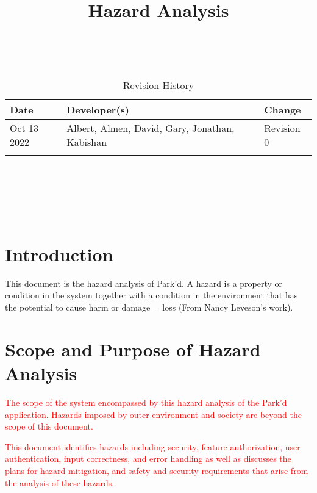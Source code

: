 \documentclass[12pt,letterpaper]{article}
\title{Hazard Analysis\\\progname}
\author{\authname}
\date{}
\begin{document}
\maketitle
\thispagestyle{empty}

~\newpage


\begin{table}[hp]
\caption{Revision History} \label{TblRevisionHistory}
\begin{tabularx}{\textwidth}{lll}
\toprule
\textbf{Date} & \textbf{Developer(s)} & \textbf{Change}\\
\midrule
Oct 13 2022 & Albert, Almen, David, Gary, Jonathan, Kabishan & Revision 0\\
\midrule
\color{red}{Apr 3 2023} & \color{red}{Albert, Almen, David, Gary, Jonathan,
Kabishan} & \color{red}{Revision 1}\\
\bottomrule
\end{tabularx}
\end{table}

~\newpage

\tableofcontents

~\newpage

\listoftables

~\newpage


\section{Introduction}

This document is the hazard analysis of Park'd. A hazard is a property or
condition in the system together with a condition in the environment that has
the potential to cause harm or damage = loss (From Nancy Leveson's work).

\section{Scope and Purpose of Hazard Analysis}

\textcolor{red}{The scope of the system encompassed by this hazard analysis of the Park'd application. Hazards imposed by outer environment and society are beyond the scope of this document.}

\textcolor{red}{This document identifies hazards including security, feature authorization, user authentication, input correctness, and error handling as well as discusses the plans for hazard mitigation, and safety and security requirements that arise from the analysis of these hazards.}
\end{document}
